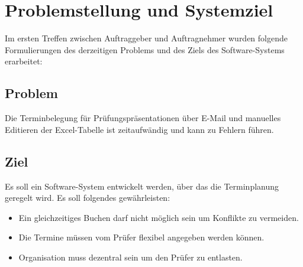 \section{Problemstellung und Systemziel}
Im ersten Treffen zwischen Auftraggeber und Auftragnehmer wurden folgende Formulierungen des derzeitigen Problems und des Ziels des Software-Systems erarbeitet:

\subsection{Problem}
Die Terminbelegung für Prüfungspräsentationen über E-Mail und manuelles Editieren der Excel-Tabelle ist zeitaufwändig und kann zu Fehlern führen.

\subsection{Ziel}
Es soll ein Software-System entwickelt werden, über das die
Terminplanung geregelt wird. Es soll folgendes gewährleisten:
\begin{itemize}
  \item Ein gleichzeitiges Buchen darf nicht möglich sein um Konflikte zu vermeiden.
  \item Die Termine müssen vom Prüfer flexibel angegeben werden können.
  \item Organisation muss dezentral sein um den Prüfer zu entlasten.
\end{itemize}
